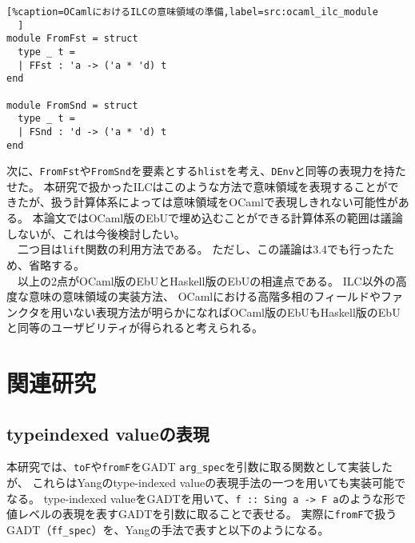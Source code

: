 \documentclass[uplatex]{sumiilab-paper}
\theoremstyle{mystyle}
\numberwithin{definition}{chapter} %
\begin{document}
\begin{lstlisting}[%caption=OCamlにおけるILCの意味領域の準備,label=src:ocaml_ilc_module
  ]
module FromFst = struct 
  type _ t = 
  | FFst : 'a -> ('a * 'd) t  
end 

module FromSnd = struct 
  type _ t = 
  | FSnd : 'd -> ('a * 'd) t  
end
\end{lstlisting}

次に、{\tt FromFst}や{\tt FromSnd}を要素とする{\tt hlist}を考え、{\tt DEnv}と同等の表現力を持たせた。
本研究で扱かったILCはこのような方法で意味領域を表現することができたが、扱う計算体系によっては意味領域をOCamlで表現しきれない可能性がある。
本論文ではOCaml版のEbUで埋め込むことができる計算体系の範囲は議論しないが、これは今後検討したい。\\
　二つ目は{\tt lift}関数の利用方法である。
ただし、この議論は3.4でも行ったため、省略する。\\
　以上の2点がOCaml版のEbUとHaskell版のEbUの相違点である。
ILC以外の高度な意味の意味領域の実装方法、
OCamlにおける高階多相のフィールドやファンクタを用いない表現方法が明らかになればOCaml版のEbUもHaskell版のEbUと同等のユーザビリティが得られると考えられる。

\chapter{関連研究}
\section{type\-indexed valueの表現}
本研究では、{\tt toF}や{\tt fromF}をGADT {\tt arg\_spec}を引数に取る関数として実装したが、
これらはYang\cite{YANG2004151}のtype-indexed valueの表現手法の一つを用いても実装可能でなる。
type-indexed valueをGADTを用いて、{\tt f :: Sing a -> F a}のような形で値レベルの表現を表すGADTを引数に取ることで表せる。
実際に{\tt fromF}で扱うGADT（{\tt ff\_spec}）を、Yangの手法で表すと以下のようになる。
\end{document}
